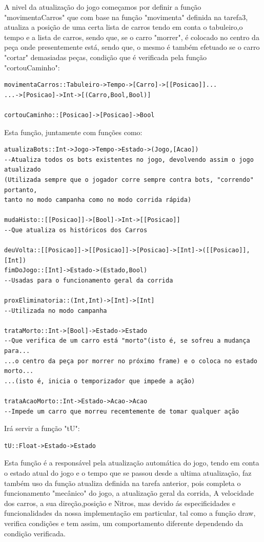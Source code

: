 \documentclass[a4paper]{report} %
\begin{document}
A nivel da atualização do jogo começamos por definir a função "movimentaCarros" que com base na função "movimenta" definida na tarefa3, atualiza a posição de uma certa lista de carros tendo em conta o tabuleiro,o tempo e a lista de carros, sendo que, se o carro "morrer", é colocado no centro da peça onde presentemente está, sendo que, o mesmo é também efetuado se o carro "cortar" demasiadas peças, condição que é verificada pela função "cortouCaminho":

\begin{verbatim}
movimentaCarros::Tabuleiro->Tempo->[Carro]->[[Posicao]]...
...->[Posicao]->Int->[(Carro,Bool,Bool)]

cortouCaminho::[Posicao]->[Posicao]->Bool
\end{verbatim}
Esta função, juntamente com funções como:
\begin{verbatim}
atualizaBots::Int->Jogo->Tempo->Estado->(Jogo,[Acao])
--Atualiza todos os bots existentes no jogo, devolvendo assim o jogo atualizado 
(Utilizada sempre que o jogador corre sempre contra bots, "correndo" portanto, 
tanto no modo campanha como no modo corrida rápida)

mudaHisto::[[Posicao]]->[Bool]->Int->[[Posicao]]
--Que atualiza os históricos dos Carros

deuVolta::[[Posicao]]->[[Posicao]]->[Posicao]->[Int]->([[Posicao]],[Int])
fimDoJogo::[Int]->Estado->(Estado,Bool) 
--Usadas para o funcionamento geral da corrida

proxEliminatoria::(Int,Int)->[Int]->[Int]
--Utilizada no modo campanha

trataMorto::Int->[Bool]->Estado->Estado
--Que verifica de um carro está "morto"(isto é, se sofreu a mudança para... 
...o centro da peça por morrer no próximo frame) e o coloca no estado morto...
...(isto é, inicia o temporizador que impede a ação)

trataAcaoMorto::Int->Estado->Acao->Acao
--Impede um carro que morreu recemtemente de tomar qualquer ação
\end{verbatim}

Irá servir a função "tU":
\begin{verbatim}
tU::Float->Estado->Estado
\end{verbatim}
Esta função é a responsável pela atualização automática do jogo, tendo em conta o estado atual do jogo e o tempo que se passou desde a ultima atualização, faz também uso da função atualiza definida na tarefa anterior, pois completa o funcionamento "mecânico" do jogo, a atualização geral da corrida, A velocidade dos carros, a sua direção,posição e Nitros, mas devido ás especificidades e funcionalidades da nossa implementação em particular, tal como a função draw, verifica condições e tem assim, um comportamento diferente dependendo da condição verificada.
\end{document}
